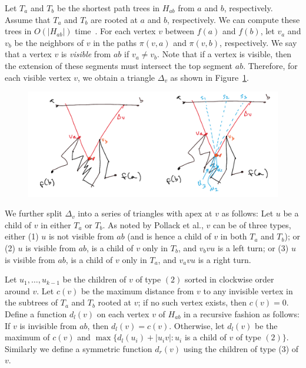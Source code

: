 \documentclass[a4paper,UKenglish]{lipics}
\newcommand{\ff}[1]{\ensuremath{f(#1)}}
\newcommand{\p}[2]{\ensuremath{\pi(#1, #2)}}
\begin{document}
Let $T_a$ and $T_b$ be the shortest path trees in $H_{ab}$ from $a$ and $b$, respectively. Assume that $T_a$ and $T_b$ are rooted at $a$ and $b$, respectively.
We can compute these trees in $O(|H_{ab}|)$ time~\cite{guibasShortestPathTree}. 
For each vertex $v$ between $\ff{a}$ and $\ff{b}$, let $v_a$ and $v_b$ be the neighbors of $v$ in the paths $\p{v}{a}$ and $\p{v}{ b}$, respectively.
We say that a vertex $v$ is \emph{visible} from $ab$ if $v_a\neq v_b$.
Note that if a vertex is visible, then the extension of these segments must intersect the top segment $ab$. 
Therefore, for each visible vertex $v$, we obtain a triangle $\Delta_v$ as shown in Figure~\ref{fig:Hourglass Cover}.

\begin{figure}[tb]
\centering
\includegraphics[width=1\textwidth]{img/HourglassCover.pdf}
\caption{\small }
\label{fig:Hourglass Cover}
\end{figure}

We further split $\Delta_v$ into a series of triangles with apex at $v$ as follows: 
Let $u$ be a child of $v$ in either $T_a$ or $T_b$. As noted by Pollack et al., $v$ can be of three types, either (1) $u$ is not visible from $ab$ (and is hence a child of $v$ in both $T_a$ and $T_b$); or (2) $u$ is visible from $ab$, is a child of $v$ only in $T_b$, and $v_b v u$ is a left turn; or (3) $u$ is visible from $ab$, is a child of $v$ only in $T_a$, and $v_a v u$ is a right turn.

Let $u_1, \ldots, u_{k-1}$ be the children of $v$ of type $(2)$ sorted in clockwise order around $v$.
Let $c(v)$ be the maximum distance from $v$ to any invisible vertex in the subtrees of $T_a$ and $T_b$ rooted at $v$; if no such vertex exists, then $c(v) = 0$. 
Define a function $d_l(v)$ on each vertex $v$ of $H_{ab}$ in a recursive fashion as follows:
If $v$ is invisible from $ab$, then $d_l(v) = c(v)$. 
Otherwise, let $d_l(v)$ be the maximum of $c(v)$ and $\max\{d_l(u_i) + |u_iv| : u_i$ is a child of $v$ of type $(2)\}$.
Similarly we define a symmetric function $d_r(v)$ using the children of type (3) of $v$.
\end{document}
